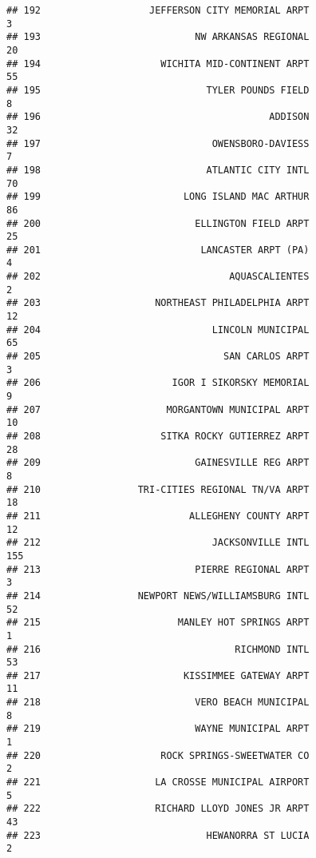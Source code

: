 \documentclass[
]{article}
\begin{document}
\begin{verbatim}
## 192                   JEFFERSON CITY MEMORIAL ARPT                           3
## 193                           NW ARKANSAS REGIONAL                          20
## 194                     WICHITA MID-CONTINENT ARPT                          55
## 195                             TYLER POUNDS FIELD                           8
## 196                                        ADDISON                          32
## 197                              OWENSBORO-DAVIESS                           7
## 198                             ATLANTIC CITY INTL                          70
## 199                         LONG ISLAND MAC ARTHUR                          86
## 200                           ELLINGTON FIELD ARPT                          25
## 201                            LANCASTER ARPT (PA)                           4
## 202                                 AQUASCALIENTES                           2
## 203                    NORTHEAST PHILADELPHIA ARPT                          12
## 204                              LINCOLN MUNICIPAL                          65
## 205                                SAN CARLOS ARPT                           3
## 206                       IGOR I SIKORSKY MEMORIAL                           9
## 207                      MORGANTOWN MUNICIPAL ARPT                          10
## 208                     SITKA ROCKY GUTIERREZ ARPT                          28
## 209                           GAINESVILLE REG ARPT                           8
## 210                 TRI-CITIES REGIONAL TN/VA ARPT                          18
## 211                          ALLEGHENY COUNTY ARPT                          12
## 212                              JACKSONVILLE INTL                         155
## 213                           PIERRE REGIONAL ARPT                           3
## 214                 NEWPORT NEWS/WILLIAMSBURG INTL                          52
## 215                        MANLEY HOT SPRINGS ARPT                           1
## 216                                  RICHMOND INTL                          53
## 217                         KISSIMMEE GATEWAY ARPT                          11
## 218                           VERO BEACH MUNICIPAL                           8
## 219                           WAYNE MUNICIPAL ARPT                           1
## 220                     ROCK SPRINGS-SWEETWATER CO                           2
## 221                    LA CROSSE MUNICIPAL AIRPORT                           5
## 222                    RICHARD LLOYD JONES JR ARPT                          43
## 223                             HEWANORRA ST LUCIA                           2

\end{verbatim}
\end{document}
